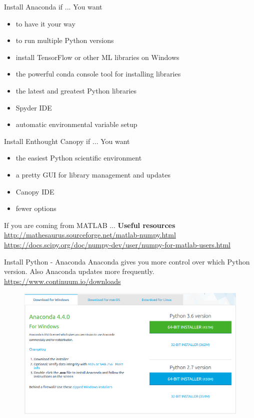 \documentclass[10pt]{beamer}
\begin{document}
\begin{frame}{Install Anaconda if ...}
You want
\begin{itemize}
\item to have it your way
\item to run multiple Python versions
\item install TensorFlow or other ML libraries on Windows
\item the powerful conda console tool for installing libraries
\item the latest and greatest Python libraries
\item Spyder IDE
\item automatic environmental variable setup
\end{itemize}

\end{frame}

\begin{frame}{Install Enthought Canopy if ...}
You want
\begin{itemize}
\item the easiest Python scientific environment
\item a pretty GUI for library management and updates
\item Canopy IDE
\item fewer options
\end{itemize}

\end{frame}

\begin{frame}{If you are coming from MATLAB ...}
\textbf{Useful resources}
\url{http://mathesaurus.sourceforge.net/matlab-numpy.html}
\url{https://docs.scipy.org/doc/numpy-dev/user/numpy-for-matlab-users.html}
\end{frame}

\begin{frame}{Install Python - Anaconda}
Anaconda gives you more control over which Python version. Also Anaconda updates more frequently.
\url{https://www.continuum.io/downloads}
          \begin{figure} 	
 	\includegraphics[width=1.0\textwidth]{figs/anaconda.png}
      \end{figure}
\end{frame}
\end{document}
